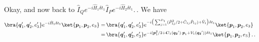 \documentclass{report}
\begin{document}
Okay, and now back to $\hat I_Q e^{-i  \hat H_{1} \delta t_1 } \hat I_P e^{-i \hat H_{2} \delta t_1}$.\,. We have
\begin{align}
\begin{aligned}
	\bra{\boldsymbol{q}_1', \boldsymbol{q}_2', e_3'} 
		e^{-i  \hat H_{1} \delta t_1 } 
	\ket{\boldsymbol{p}_1, \boldsymbol{p}_2, e_3}
	=&\,
	\bra{\boldsymbol{q}_1', \boldsymbol{q}_2', e_3'} 
		e^{
			-i
			\big(
				\sum_{j=1}^{D_1} (
					\hat P_{1j}^2 / 2 + 
					\hat C_{1j} \hat P_{1j}
				) +
				\hat V_1
			\big)
			\delta t_1
		} 
	\ket{\boldsymbol{p}_1, \boldsymbol{p}_2, e_3} 
	\\=&\,
	\bra{\boldsymbol{q}_1', \boldsymbol{q}_2', e_3'} 
		e^{
			-i
			(
				\boldsymbol p_{1}^2 / 2 + 
				\boldsymbol C_{1}(\boldsymbol{q_2}') \cdot \boldsymbol p_{1} +
				V_1(\boldsymbol{q_2}')
			)
			\delta t_1
		} 
	\ket{\boldsymbol{p}_1, \boldsymbol{p}_2, e_3} \,.\,. 
	\label{pppqqppqpqp_01}
\end{aligned}
\end{align}
\end{document}
